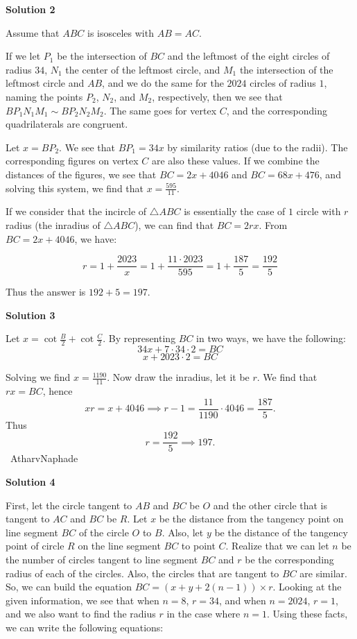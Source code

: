 \begin{enumerate}
 



\textbf{Solution 2}

Assume that $ABC$ is isosceles with $AB=AC$.

 If we let $P_1$ be the intersection of $BC$ and the leftmost of the eight circles of radius $34$, $N_1$ the center of the leftmost circle, and $M_1$ the intersection of the leftmost circle and $AB$, and we do the same for the $2024$ circles of radius $1$, naming the points $P_2$, $N_2$, and $M_2$, respectively, then we see that $BP_1N_1M_1\sim BP_2N_2M_2$. The same goes for vertex $C$, and the corresponding quadrilaterals are congruent.

 Let $x=BP_2$. We see that $BP_1=34x$ by similarity ratios (due to the radii). The corresponding figures on vertex $C$ are also these values. If we combine the distances of the figures, we see that $BC=2x+4046$ and $BC=68x+476$, and solving this system, we find that $x=\frac{595}{11}$.

 If we consider that the incircle of $\triangle ABC$ is essentially the case of $1$ circle with $r$ radius (the inradius of $\triangle ABC$), we can find that $BC=2rx$. From $BC=2x+4046$, we have:

 
 \[r=1+\frac{2023}{x}=1+\frac{11\cdot2023}{595}=1+\frac{187}{5}=\frac{192}{5}\]

 Thus the answer is $192+5=\boxed{197}$.

 



\textbf{Solution 3}

Let $x = \cot{\frac{B}{2}} + \cot{\frac{C}{2}}$. By representing $BC$ in two ways, we have the following:
 \[34x + 7\cdot 34\cdot 2 = BC\]
 \[x + 2023 \cdot 2 = BC\]

 Solving we find $x = \frac{1190}{11}$. Now draw the inradius, let it be $r$. We find that $rx =BC$, hence 
 \[xr = x + 4046 \implies r-1 = \frac{11}{1190}\cdot 4046 = \frac{187}{5}.\]Thus 
 \[r = \frac{192}{5} \implies \boxed{197}.\]~AtharvNaphade

 



\textbf{Solution 4}

First, let the circle tangent to $AB$ and $BC$ be $O$ and the other circle that is tangent to $AC$ and $BC$ be $R$. Let $x$ be the distance from the tangency point on line segment $BC$ of the circle $O$ to $B$. Also, let $y$ be the distance of the tangency point of circle $R$ on the line segment $BC$ to point $C$. Realize that we can let $n$ be the number of circles tangent to line segment $BC$ and $r$ be the corresponding radius of each of the circles. Also, the circles that are tangent to $BC$ are similar. So, we can build the equation $BC = (x+y+2(n-1)) \times r$. Looking at the given information, we see that when $n=8$, $r=34$, and when $n=2024$, $r=1$, and we also want to find the radius $r$ in the case where $n=1$. Using these facts, we can write the following equations:


\end{enumerate}
